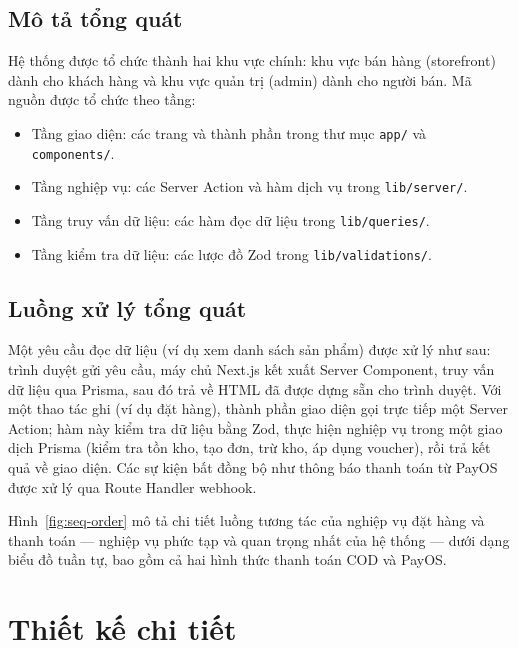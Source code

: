 \subsection{Mô tả tổng quát}

Hệ thống được tổ chức thành hai khu vực chính: khu vực bán hàng (storefront) dành cho khách
hàng và khu vực quản trị (admin) dành cho người bán. Mã nguồn được tổ chức theo tầng:

\begin{itemize}
  \item Tầng giao diện: các trang và thành phần trong thư mục \texttt{app/} và \texttt{components/}.
  \item Tầng nghiệp vụ: các Server Action và hàm dịch vụ trong \texttt{lib/server/}.
  \item Tầng truy vấn dữ liệu: các hàm đọc dữ liệu trong \texttt{lib/queries/}.
  \item Tầng kiểm tra dữ liệu: các lược đồ Zod trong \texttt{lib/validations/}.
\end{itemize}

\subsection{Luồng xử lý tổng quát}

Một yêu cầu đọc dữ liệu (ví dụ xem danh sách sản phẩm) được xử lý như sau: trình duyệt gửi yêu
cầu, máy chủ Next.js kết xuất Server Component, truy vấn dữ liệu qua Prisma, sau đó trả về HTML
đã được dựng sẵn cho trình duyệt. Với một thao tác ghi (ví dụ đặt hàng), thành phần giao diện gọi
trực tiếp một Server Action; hàm này kiểm tra dữ liệu bằng Zod, thực hiện nghiệp vụ trong một
giao dịch Prisma (kiểm tra tồn kho, tạo đơn, trừ kho, áp dụng voucher), rồi trả kết quả về giao
diện. Các sự kiện bất đồng bộ như thông báo thanh toán từ PayOS được xử lý qua Route Handler
webhook.

Hình~\ref{fig:seq-order} mô tả chi tiết luồng tương tác của nghiệp vụ đặt hàng và thanh toán ---
nghiệp vụ phức tạp và quan trọng nhất của hệ thống --- dưới dạng biểu đồ tuần tự, bao gồm cả hai
hình thức thanh toán COD và PayOS.


\section{Thiết kế chi tiết}

